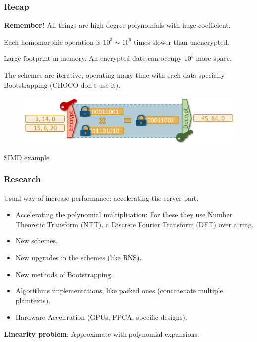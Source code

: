 \documentclass[10pt,handout]{beamer}
\begin{document}
\begin{frame}
\frametitle{Recap}

    \textbf{Remember!} All things are high degree polynomials with huge coefficient.


Each homomorphic operation is $10^3 \sim 10^6$ times slower than unencrypted.
\pause

Large footprint in memory.
An encrypted date can occupy $10^5$ more space.

\pause
    The schemes are iterative, operating many time with each data specially Bootstrapping (CHOCO don't use it).

        \begin{figure}[h!]
            \centering
            \includegraphics[scale=0.8]{workflow.png}
        \end{figure}
    \centering
        SIMD example


\end{frame}


\begin{frame}
\frametitle{Research}

    Usual way of increase performance:  accelerating the server part.
\begin{itemize}\itemsep-0.7em
   \item Accelerating the polynomial multiplication:
    For these they use Number Theoretic Transform (NTT), a Discrete Fourier Transform (DFT) over a ring.
   \item New schemes.
   \item New upgrades in the schemes (like RNS).
   \item New methods of Bootstrapping.
   \item Algorithms implementations, like packed ones (concatenate multiple plaintexts).
   \item Hardware Acceleration (GPUs, FPGA, specific designs).
\end{itemize}

    \textbf{Linearity problem}: Approximate with polynomial expansions.
\end{frame}
\end{document}
